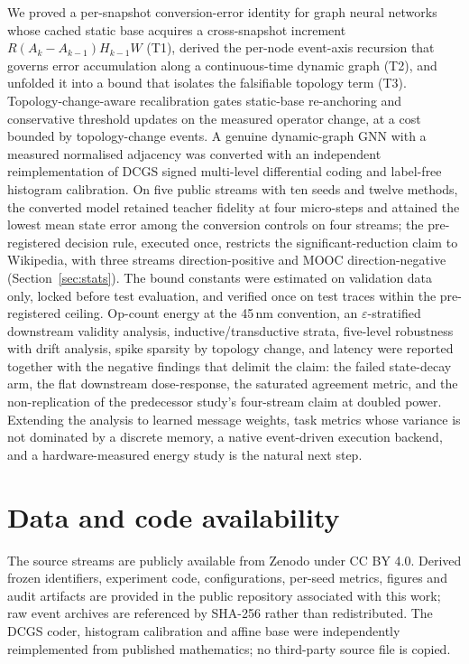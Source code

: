\documentclass[preprint,12pt]{elsarticle}
\begin{document}
We proved a per-snapshot conversion-error identity for graph neural networks whose cached static base acquires a cross-snapshot increment $R(A_k-A_{k-1})H_{k-1}W$ (T1), derived the per-node event-axis recursion that governs error accumulation along a continuous-time dynamic graph (T2), and unfolded it into a bound that isolates the falsifiable topology term (T3). Topology-change-aware recalibration gates static-base re-anchoring and conservative threshold updates on the measured operator change, at a cost bounded by topology-change events. A genuine dynamic-graph GNN with a measured normalised adjacency was converted with an independent reimplementation of DCGS signed multi-level differential coding and label-free histogram calibration. On five public streams with ten seeds and twelve methods, the converted model retained teacher fidelity at four micro-steps and attained the lowest mean state error among the conversion controls on four streams; the pre-registered decision rule, executed once, restricts the significant-reduction claim to Wikipedia, with three streams direction-positive and MOOC direction-negative (Section~\ref{sec:stats}). The bound constants were estimated on validation data only, locked before test evaluation, and verified once on test traces within the pre-registered ceiling. Op-count energy at the 45\,nm convention, an $\varepsilon$-stratified downstream validity analysis, inductive/transductive strata, five-level robustness with drift analysis, spike sparsity by topology change, and latency were reported together with the negative findings that delimit the claim: the failed state-decay arm, the flat downstream dose-response, the saturated agreement metric, and the non-replication of the predecessor study's four-stream claim at doubled power. Extending the analysis to learned message weights, task metrics whose variance is not dominated by a discrete memory, a native event-driven execution backend, and a hardware-measured energy study is the natural next step.

\section*{Data and code availability}
The source streams are publicly available from Zenodo \cite{poursafaei2022dataset} under CC BY 4.0. Derived frozen identifiers, experiment code, configurations, per-seed metrics, figures and audit artifacts are provided in the public repository associated with this work; raw event archives are referenced by SHA-256 rather than redistributed. The DCGS coder, histogram calibration and affine base were independently reimplemented from published mathematics; no third-party source file is copied.
\end{document}

